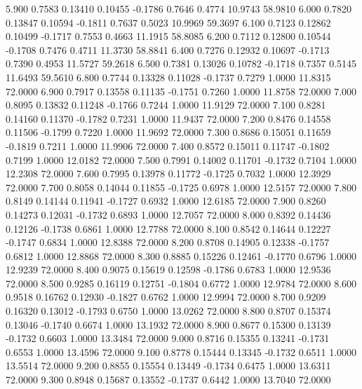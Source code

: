   5.900   0.7583   0.13410   0.10455  -0.1786   0.7646   0.4774  10.9743  58.9810
   6.000   0.7820   0.13847   0.10594  -0.1811   0.7637   0.5023  10.9969  59.3697
   6.100   0.7123   0.12862   0.10499  -0.1717   0.7553   0.4663  11.1915  58.8085
   6.200   0.7112   0.12800   0.10544  -0.1708   0.7476   0.4711  11.3730  58.8841
   6.400   0.7276   0.12932   0.10697  -0.1713   0.7390   0.4953  11.5727  59.2618
   6.500   0.7381   0.13026   0.10782  -0.1718   0.7357   0.5145  11.6493  59.5610
   6.800   0.7744   0.13328   0.11028  -0.1737   0.7279   1.0000  11.8315  72.0000
   6.900   0.7917   0.13558   0.11135  -0.1751   0.7260   1.0000  11.8758  72.0000
   7.000   0.8095   0.13832   0.11248  -0.1766   0.7244   1.0000  11.9129  72.0000
   7.100   0.8281   0.14160   0.11370  -0.1782   0.7231   1.0000  11.9437  72.0000
   7.200   0.8476   0.14558   0.11506  -0.1799   0.7220   1.0000  11.9692  72.0000
   7.300   0.8686   0.15051   0.11659  -0.1819   0.7211   1.0000  11.9906  72.0000
   7.400   0.8572   0.15011   0.11747  -0.1802   0.7199   1.0000  12.0182  72.0000
   7.500   0.7991   0.14002   0.11701  -0.1732   0.7104   1.0000  12.2308  72.0000
   7.600   0.7995   0.13978   0.11772  -0.1725   0.7032   1.0000  12.3929  72.0000
   7.700   0.8058   0.14044   0.11855  -0.1725   0.6978   1.0000  12.5157  72.0000
   7.800   0.8149   0.14144   0.11941  -0.1727   0.6932   1.0000  12.6185  72.0000
   7.900   0.8260   0.14273   0.12031  -0.1732   0.6893   1.0000  12.7057  72.0000
   8.000   0.8392   0.14436   0.12126  -0.1738   0.6861   1.0000  12.7788  72.0000
   8.100   0.8542   0.14644   0.12227  -0.1747   0.6834   1.0000  12.8388  72.0000
   8.200   0.8708   0.14905   0.12338  -0.1757   0.6812   1.0000  12.8868  72.0000
   8.300   0.8885   0.15226   0.12461  -0.1770   0.6796   1.0000  12.9239  72.0000
   8.400   0.9075   0.15619   0.12598  -0.1786   0.6783   1.0000  12.9536  72.0000
   8.500   0.9285   0.16119   0.12751  -0.1804   0.6772   1.0000  12.9784  72.0000
   8.600   0.9518   0.16762   0.12930  -0.1827   0.6762   1.0000  12.9994  72.0000
   8.700   0.9209   0.16320   0.13012  -0.1793   0.6750   1.0000  13.0262  72.0000
   8.800   0.8707   0.15374   0.13046  -0.1740   0.6674   1.0000  13.1932  72.0000
   8.900   0.8677   0.15300   0.13139  -0.1732   0.6603   1.0000  13.3484  72.0000
   9.000   0.8716   0.15355   0.13241  -0.1731   0.6553   1.0000  13.4596  72.0000
   9.100   0.8778   0.15444   0.13345  -0.1732   0.6511   1.0000  13.5514  72.0000
   9.200   0.8855   0.15554   0.13449  -0.1734   0.6475   1.0000  13.6311  72.0000
   9.300   0.8948   0.15687   0.13552  -0.1737   0.6442   1.0000  13.7040  72.0000
